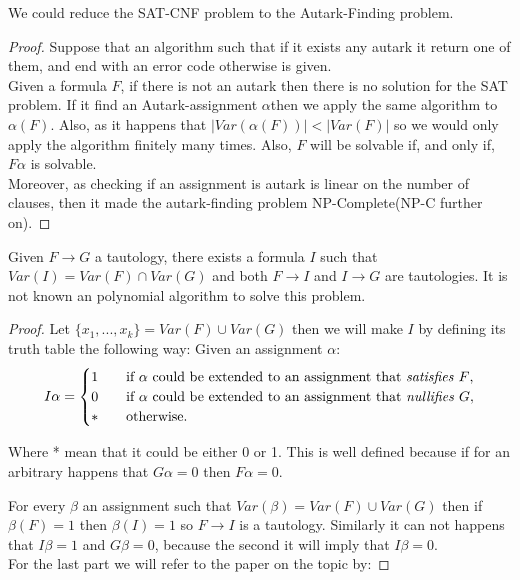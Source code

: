 \begin{proposition} We could reduce the SAT-CNF problem to the Autark-Finding problem.
\begin{proof} Suppose that an algorithm such that if it exists any autark it return one of them, and end with an error code otherwise is given.  \\

Given a formula $F$, if there is not an autark then there is no solution for the SAT problem. If it find an Autark-assignment $\alpha$then we apply the same algorithm to $\alpha(F)$. Also, as it happens that $|Var(\alpha(F))|<|Var(F)|$ so we would only apply the algorithm finitely many times. Also, $F$ will be solvable if, and only if, $F\alpha$ is solvable.	\\

Moreover, as checking if an assignment is autark is linear on the number of clauses, then it made the autark-finding problem NP-Complete(NP-C further on).
\end{proof}
	
\end{proposition}



\begin{proposition}
	Given $F \to G$ a tautology, there exists a formula $I$ such that $Var(I) = Var(F)\cap Var(G)$ and both $F\to I$ and $I \to G$ are tautologies. It is not known an polynomial algorithm to solve this problem. 
\end{proposition}

\begin{proof} Let $\{x_1,...,x_k\} = Var(F)\cup Var(G)$ then we will make $I$ by defining its truth table the following way: Given an assignment $\alpha$:
\[   
I\alpha = 
     \begin{cases}
       1&\quad\text{if $\alpha$ could be extended to an assignment that \emph{satisfies} $F$}, \\
       0&\quad\text{if $\alpha$ could be extended to an assignment that \emph{nullifies} $G$},\\
     * &\quad\text{otherwise.} \\ 
     \end{cases}
\]

Where * mean that it could be either 0 or 1.  This is well defined because if for an arbitrary happens that $G\alpha = 0$ then $F\alpha = 0$.

For every $\beta$ an assignment such that $Var(\beta) = Var(F)\cup Var(G)$ then if $\beta(F) = 1$ then $\beta(I) = 1$ so $F \to I$  is a tautology. Similarly it can not happens that $I\beta = 1 $ and $G\beta = 0$, because the second it will imply that   $I\beta = 0$.\\

For the last part we will refer to the paper on the topic by: 



\end{proof}

